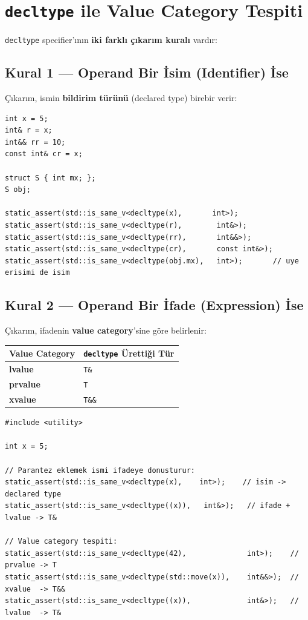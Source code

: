 \documentclass[a4paper,12pt]{article}
\begin{document}
\section{\texttt{decltype} ile Value Category Tespiti}

\texttt{decltype} specifier'ının \textbf{iki farklı çıkarım kuralı} vardır:

\subsection{Kural 1 --- Operand Bir İsim (Identifier) İse}

Çıkarım, ismin \textbf{bildirim türünü} (declared type) birebir verir:

\begin{lstlisting}
int x = 5;
int& r = x;
int&& rr = 10;
const int& cr = x;

struct S { int mx; };
S obj;

static_assert(std::is_same_v<decltype(x),       int>);
static_assert(std::is_same_v<decltype(r),        int&>);
static_assert(std::is_same_v<decltype(rr),       int&&>);
static_assert(std::is_same_v<decltype(cr),       const int&>);
static_assert(std::is_same_v<decltype(obj.mx),   int>);       // uye erisimi de isim
\end{lstlisting}

\subsection{Kural 2 --- Operand Bir İfade (Expression) İse}

Çıkarım, ifadenin \textbf{value category}'sine göre belirlenir:

\begin{table}[h]
\centering
\begin{tabular}{@{}ll@{}}
\toprule
\textbf{Value Category} & \textbf{\texttt{decltype} Ürettiği Tür} \\
\midrule
\textbf{lvalue}  & \texttt{T\&}  \\
\textbf{prvalue} & \texttt{T}    \\
\textbf{xvalue}  & \texttt{T\&\&} \\
\bottomrule
\end{tabular}
\end{table}

\begin{lstlisting}
#include <utility>

int x = 5;

// Parantez eklemek ismi ifadeye donusturur:
static_assert(std::is_same_v<decltype(x),    int>);    // isim -> declared type
static_assert(std::is_same_v<decltype((x)),   int&>);   // ifade + lvalue -> T&

// Value category tespiti:
static_assert(std::is_same_v<decltype(42),              int>);    // prvalue -> T
static_assert(std::is_same_v<decltype(std::move(x)),    int&&>);  // xvalue  -> T&&
static_assert(std::is_same_v<decltype((x)),             int&>);   // lvalue  -> T&
\end{lstlisting}
\end{document}
